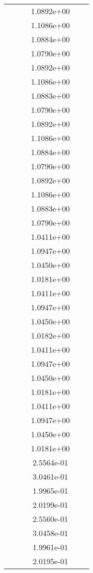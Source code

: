 \begin{xltabular}{\textwidth}{r|rS[table-format=1.3e+2]S[table-format=1.4e+2]S[table-format=1.4e+2]S[table-format=-1.5]}
&  &  & 1.0892e+00 & & \\
&  &  & 1.1086e+00 & & \\
&  &  & 1.0884e+00 & & \\
&  &  & 1.0790e+00 & & \\
&  &  & 1.0892e+00 & & \\
&  &  & 1.1086e+00 & & \\
&  &  & 1.0883e+00 & & \\
&  &  & 1.0790e+00 & & \\
&  &  & 1.0892e+00 & & \\
&  &  & 1.1086e+00 & & \\
&  &  & 1.0884e+00 & & \\
&  &  & 1.0790e+00 & & \\
&  &  & 1.0892e+00 & & \\
&  &  & 1.1086e+00 & & \\
&  &  & 1.0883e+00 & & \\
&  &  & 1.0790e+00 & & \\
&  &  & 1.0411e+00 & & \\
&  &  & 1.0947e+00 & & \\
&  &  & 1.0450e+00 & & \\
&  &  & 1.0181e+00 & & \\
&  &  & 1.0411e+00 & & \\
&  &  & 1.0947e+00 & & \\
&  &  & 1.0450e+00 & & \\
&  &  & 1.0182e+00 & & \\
&  &  & 1.0411e+00 & & \\
&  &  & 1.0947e+00 & & \\
&  &  & 1.0450e+00 & & \\
&  &  & 1.0181e+00 & & \\
&  &  & 1.0411e+00 & & \\
&  &  & 1.0947e+00 & & \\
&  &  & 1.0450e+00 & & \\
&  &  & 1.0181e+00 & & \\
&  &  & 2.5564e-01 & & \\
&  &  & 3.0461e-01 & & \\
&  &  & 1.9965e-01 & & \\
&  &  & 2.0199e-01 & & \\
&  &  & 2.5560e-01 & & \\
&  &  & 3.0458e-01 & & \\
&  &  & 1.9961e-01 & & \\
&  &  & 2.0195e-01 & & \\

\end{xltabular}
